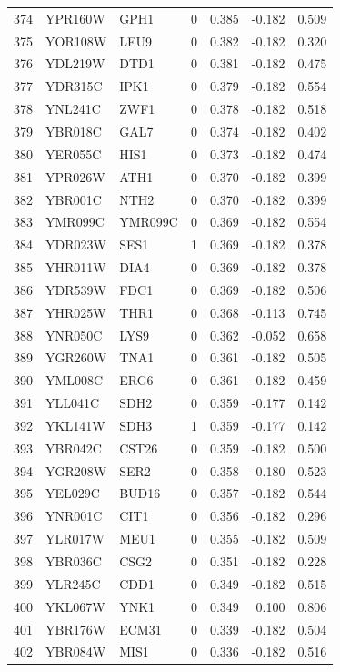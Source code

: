 \begin{longtable}{rllrrrr}
374 & YPR160W & GPH1 & 0 & 0.385 & -0.182 & 0.509\\
375 & YOR108W & LEU9 & 0 & 0.382 & -0.182 & 0.320\\
376 & YDL219W & DTD1 & 0 & 0.381 & -0.182 & 0.475\\
377 & YDR315C & IPK1 & 0 & 0.379 & -0.182 & 0.554\\
378 & YNL241C & ZWF1 & 0 & 0.378 & -0.182 & 0.518\\
379 & YBR018C & GAL7 & 0 & 0.374 & -0.182 & 0.402\\
380 & YER055C & HIS1 & 0 & 0.373 & -0.182 & 0.474\\
381 & YPR026W & ATH1 & 0 & 0.370 & -0.182 & 0.399\\
382 & YBR001C & NTH2 & 0 & 0.370 & -0.182 & 0.399\\
383 & YMR099C & YMR099C & 0 & 0.369 & -0.182 & 0.554\\
384 & YDR023W & SES1 & 1 & 0.369 & -0.182 & 0.378\\
385 & YHR011W & DIA4 & 0 & 0.369 & -0.182 & 0.378\\
386 & YDR539W & FDC1 & 0 & 0.369 & -0.182 & 0.506\\
387 & YHR025W & THR1 & 0 & 0.368 & -0.113 & 0.745\\
388 & YNR050C & LYS9 & 0 & 0.362 & -0.052 & 0.658\\
389 & YGR260W & TNA1 & 0 & 0.361 & -0.182 & 0.505\\
390 & YML008C & ERG6 & 0 & 0.361 & -0.182 & 0.459\\
391 & YLL041C & SDH2 & 0 & 0.359 & -0.177 & 0.142\\
392 & YKL141W & SDH3 & 1 & 0.359 & -0.177 & 0.142\\
393 & YBR042C & CST26 & 0 & 0.359 & -0.182 & 0.500\\
394 & YGR208W & SER2 & 0 & 0.358 & -0.180 & 0.523\\
395 & YEL029C & BUD16 & 0 & 0.357 & -0.182 & 0.544\\
396 & YNR001C & CIT1 & 0 & 0.356 & -0.182 & 0.296\\
397 & YLR017W & MEU1 & 0 & 0.355 & -0.182 & 0.509\\
398 & YBR036C & CSG2 & 0 & 0.351 & -0.182 & 0.228\\
399 & YLR245C & CDD1 & 0 & 0.349 & -0.182 & 0.515\\
400 & YKL067W & YNK1 & 0 & 0.349 & 0.100 & 0.806\\
401 & YBR176W & ECM31 & 0 & 0.339 & -0.182 & 0.504\\
402 & YBR084W & MIS1 & 0 & 0.336 & -0.182 & 0.516\\

\end{longtable}
